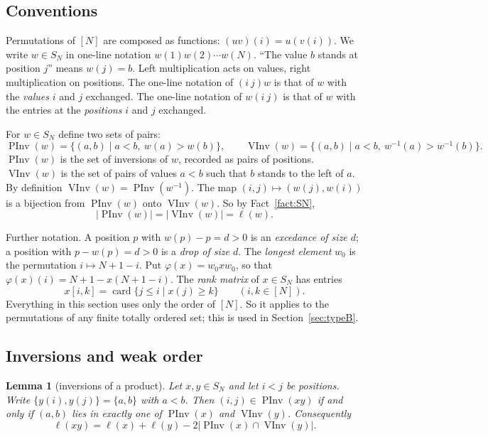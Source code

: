 \documentclass[11pt]{amsart}
\newtheorem{lemma}[theorem]{Lemma}
\theoremstyle{definition}
\theoremstyle{remark}
\numberwithin{equation}{section}
\newcommand{\abs}[1]{\lvert #1\rvert}
\DeclareMathOperator{\PInv}{PInv}
\DeclareMathOperator{\VInv}{VInv}
\DeclareMathOperator{\card}{card}
\begin{document}
\subsection{Conventions}
Permutations of \([N]\) are composed as functions: \((uv)(i)=u(v(i))\). We write \(w\in S_N\) in one-line notation \(w(1)w(2)\cdots w(N)\). ``The value \(b\) stands at position \(j\)'' means \(w(j)=b\). Left multiplication acts on values, right multiplication on positions. The one-line notation of \((i\ j)w\) is that of \(w\) with the \emph{values} \(i\) and \(j\) exchanged. The one-line notation of \(w(i\ j)\) is that of \(w\) with the entries at the \emph{positions} \(i\) and \(j\) exchanged.

For \(w\in S_N\) define two sets of pairs:
\[
\PInv(w)=\{(a,b)\mid a<b,\ w(a)>w(b)\},\qquad
\VInv(w)=\{(a,b)\mid a<b,\ w^{-1}(a)>w^{-1}(b)\}.
\]
\(\PInv(w)\) is the set of inversions of \(w\), recorded as pairs of positions. \(\VInv(w)\) is the set of pairs of values \(a<b\) such that \(b\) stands to the left of \(a\). By definition \(\VInv(w)=\PInv(w^{-1})\). The map \((i,j)\mapsto(w(j),w(i))\) is a bijection from \(\PInv(w)\) onto \(\VInv(w)\). So by Fact~\ref{fact:SN},
\begin{equation}\label{eq:lengthSN}
\abs{\PInv(w)}=\abs{\VInv(w)}=\ell(w).
\end{equation}

Further notation. A position \(p\) with \(w(p)-p=d>0\) is an \emph{excedance of size \(d\)}; a position with \(p-w(p)=d>0\) is a \emph{drop of size \(d\)}. The \emph{longest element} \(w_0\) is the permutation \(i\mapsto N+1-i\). Put \(\varphi(x)=w_0xw_0\), so that \(\varphi(x)(i)=N+1-x(N+1-i)\). The \emph{rank matrix} of \(x\in S_N\) has entries
\[
x[i,k]=\card\{j\le i\mid x(j)\ge k\}\qquad(i,k\in[N]).
\]
Everything in this section uses only the order of \([N]\). So it applies to the permutations of any finite totally ordered set; this is used in Section~\ref{sec:typeB}.

\subsection{Inversions and weak order}

\begin{lemma}[inversions of a product]\label{lem:product}
Let \(x,y\in S_N\) and let \(i<j\) be positions. Write \(\{y(i),y(j)\}=\{a,b\}\) with \(a<b\). Then \((i,j)\in\PInv(xy)\) if and only if \((a,b)\) lies in exactly one of \(\PInv(x)\) and \(\VInv(y)\). Consequently
\begin{equation}\label{eq:product}
\ell(xy)=\ell(x)+\ell(y)-2\abs{\PInv(x)\cap\VInv(y)}.
\end{equation}
\end{lemma}
\end{document}
